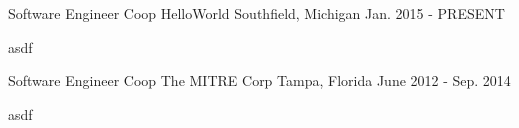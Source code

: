 

\begin{cventries}

  \cventry
    {Software Engineer Coop} %
    {HelloWorld} %
    {Southfield, Michigan} %
    {Jan. 2015 - PRESENT} %
    {
      \begin{cvitems} %
        \item {asdf}
      \end{cvitems}
    }

  \cventry
    {Software Engineer Coop} %
    {The MITRE Corp} %
    {Tampa, Florida} %
    {June 2012 - Sep. 2014} %
    {
      \begin{cvitems} %
        \item {asdf}
      \end{cvitems}
    }

\end{cventries}
